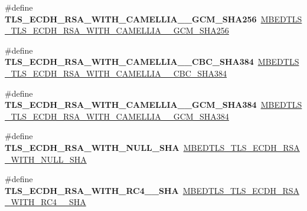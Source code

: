 \begin{DoxyCompactItemize}
\item 
\mbox{\label{compat-1_83_8h_adf33633aa33826f92aed761e7c522e71}} 
\#define {\bfseries T\+L\+S\+\_\+\+E\+C\+D\+H\+\_\+\+R\+S\+A\+\_\+\+W\+I\+T\+H\+\_\+\+C\+A\+M\+E\+L\+L\+I\+A\+\_\+\_\+\+G\+C\+M\+\_\+\+S\+H\+A256}~\mbox{\hyperlink{ssl__ciphersuites_8h_aa83af95fddb27edf5d8caf77a3d11452}{M\+B\+E\+D\+T\+L\+S\+\_\+\+T\+L\+S\+\_\+\+E\+C\+D\+H\+\_\+\+R\+S\+A\+\_\+\+W\+I\+T\+H\+\_\+\+C\+A\+M\+E\+L\+L\+I\+A\+\_\+\_\+\+G\+C\+M\+\_\+\+S\+H\+A256}}
\item 
\mbox{\label{compat-1_83_8h_a95cd929afae5e8ff7ecbea3cde22317f}} 
\#define {\bfseries T\+L\+S\+\_\+\+E\+C\+D\+H\+\_\+\+R\+S\+A\+\_\+\+W\+I\+T\+H\+\_\+\+C\+A\+M\+E\+L\+L\+I\+A\+\_\+\_\+\+C\+B\+C\+\_\+\+S\+H\+A384}~\mbox{\hyperlink{ssl__ciphersuites_8h_a231649301a478e13c49853ba5cfaaac3}{M\+B\+E\+D\+T\+L\+S\+\_\+\+T\+L\+S\+\_\+\+E\+C\+D\+H\+\_\+\+R\+S\+A\+\_\+\+W\+I\+T\+H\+\_\+\+C\+A\+M\+E\+L\+L\+I\+A\+\_\+\_\+\+C\+B\+C\+\_\+\+S\+H\+A384}}
\item 
\mbox{\label{compat-1_83_8h_abdff6e19b8b020e4fe53dd3bd5e39bd3}} 
\#define {\bfseries T\+L\+S\+\_\+\+E\+C\+D\+H\+\_\+\+R\+S\+A\+\_\+\+W\+I\+T\+H\+\_\+\+C\+A\+M\+E\+L\+L\+I\+A\+\_\+\_\+\+G\+C\+M\+\_\+\+S\+H\+A384}~\mbox{\hyperlink{ssl__ciphersuites_8h_a279c1bcea69d0ebbc72700755a9a9270}{M\+B\+E\+D\+T\+L\+S\+\_\+\+T\+L\+S\+\_\+\+E\+C\+D\+H\+\_\+\+R\+S\+A\+\_\+\+W\+I\+T\+H\+\_\+\+C\+A\+M\+E\+L\+L\+I\+A\+\_\+\_\+\+G\+C\+M\+\_\+\+S\+H\+A384}}
\item 
\mbox{\label{compat-1_83_8h_a3c0570b63d87d68aaf561e2c7e3169fb}} 
\#define {\bfseries T\+L\+S\+\_\+\+E\+C\+D\+H\+\_\+\+R\+S\+A\+\_\+\+W\+I\+T\+H\+\_\+\+N\+U\+L\+L\+\_\+\+S\+HA}~\mbox{\hyperlink{ssl__ciphersuites_8h_a19df69ed79216faf18e8d728c6222158}{M\+B\+E\+D\+T\+L\+S\+\_\+\+T\+L\+S\+\_\+\+E\+C\+D\+H\+\_\+\+R\+S\+A\+\_\+\+W\+I\+T\+H\+\_\+\+N\+U\+L\+L\+\_\+\+S\+HA}}
\item 
\mbox{\label{compat-1_83_8h_abb4976edbaa478fb4853781874f8e60b}} 
\#define {\bfseries T\+L\+S\+\_\+\+E\+C\+D\+H\+\_\+\+R\+S\+A\+\_\+\+W\+I\+T\+H\+\_\+\+R\+C4\+\_\+\_\+\+S\+HA}~\mbox{\hyperlink{ssl__ciphersuites_8h_a056993a63012bbc052dec03de3370369}{M\+B\+E\+D\+T\+L\+S\+\_\+\+T\+L\+S\+\_\+\+E\+C\+D\+H\+\_\+\+R\+S\+A\+\_\+\+W\+I\+T\+H\+\_\+\+R\+C4\+\_\+\_\+\+S\+HA}}

\end{DoxyCompactItemize}
